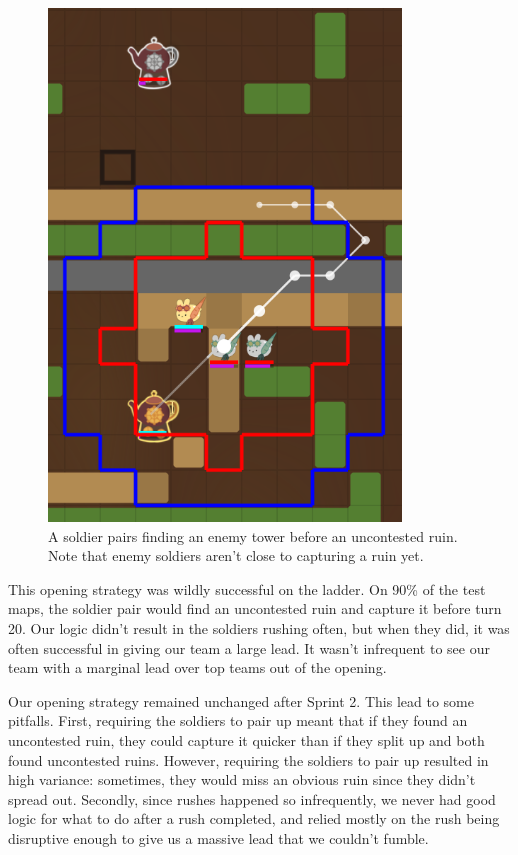 \begin{figure}[H]
  \centering
  \includegraphics[scale=0.5]{images/rush.png}
  \caption{A soldier pairs finding an enemy tower before an uncontested ruin. Note that enemy soldiers aren't close to capturing a ruin yet.}
\end{figure}

\medskip

This opening strategy was wildly successful on the ladder. On 90\% of the test maps, the soldier pair would find an uncontested ruin and capture it before turn 20. Our logic didn't result in the soldiers rushing often, but when they did, it was often successful in giving our team a large lead. It wasn't infrequent to see our team with a marginal lead over top teams out of the opening.

\medskip

Our opening strategy remained unchanged after Sprint 2. This lead to some pitfalls. First, requiring the soldiers to pair up meant that if they found an uncontested ruin, they could capture it quicker than if they split up and both found uncontested ruins. However, requiring the soldiers to pair up resulted in high variance: sometimes, they would miss an obvious ruin since they didn't spread out. Secondly, since rushes happened so infrequently, we never had good logic for what to do after a rush completed, and relied mostly on the rush being disruptive enough to give us a massive lead that we couldn't fumble.


